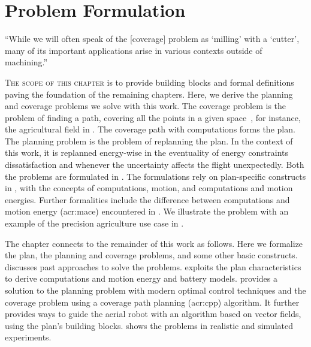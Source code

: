 
%
%
%
%
\chapter{Problem Formulation}
\label{cp:pb}

\begin{chapquote}{\cite{arkin2001optimal}}
  ``While we will often speak of the [coverage] problem as `milling' with a `cutter', many of its important applications arise in various contexts outside of machining.''
\end{chapquote}

\vspace*{1em}

\lettrine{T}{he scope of this chapter} is to provide building blocks and formal definitions paving the foundation of the remaining chapters. Here, we derive the planning and coverage problems we solve with this work. The coverage problem is the problem of finding a path, covering all the points in a given space~\citep{choset2001coverage,galceran2013survey}, for instance, the agricultural field in . The coverage path with computations forms the plan. The planning problem is the problem of replanning the plan. In the context of this work, it is replanned energy-wise in the eventuality of energy constraints dissatisfaction and whenever the uncertainty affects the flight unexpectedly. Both the problems are formulated in . The formulations rely on plan-specific constructs in , with the concepts of computations, motion, and computations and motion energies. Further formalities include the difference between computations and motion energy (\Gls{acr:mace}) encountered in . We illustrate the problem with an example of the precision agriculture use case in .

The chapter connects to the remainder of this work as follows. Here we formalize the plan, the planning and coverage problems, and some other basic constructs.  discusses past approaches to solve the problems.  exploits the plan characteristics to derive computations and motion energy and battery models.  provides a solution to the planning problem with modern optimal control techniques and the coverage problem using a coverage path planning (\Gls{acr:cpp}) algorithm. It further provides ways to guide the aerial robot with an algorithm based on vector fields, using the plan's building blocks.  shows the problems in realistic and simulated experiments.


